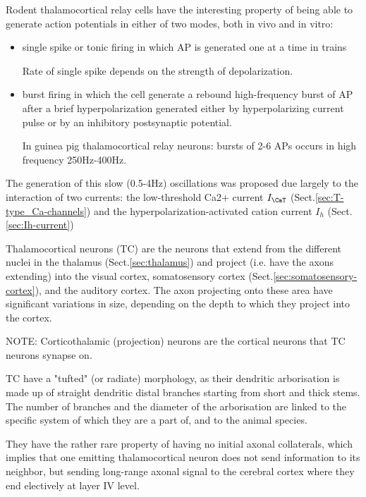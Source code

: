 Rodent thalamocortical relay cells have the interesting property of being able
to generate action potentials in either of two modes, both in vivo and in vitro:
\begin{itemize}
  \item single spike or tonic firing in which AP is generated one at a time in
  trains

Rate of single spike depends on the strength of depolarization. 

  \item burst firing in which the
  cell generate a rebound high-frequency burst of AP after a brief
  hyperpolarization generated either by hyperpolarizing current pulse or by an
  inhibitory postsynaptic potential.
  
In guinea pig thalamocortical relay neurons: bursts of 2-6 APs occurs in high
frequency 250Hz-400Hz. 
\end{itemize}

The generation of this slow (0.5-4Hz) oscillations was proposed due largely to
the interaction of two currents:
the low-threshold Ca2+ current $I_\CaT$ (Sect.\ref{sec:T-type_Ca-channels}) and the
hyperpolarization-activated cation current $I_h$ (Sect.\ref{sec:Ih-current})



Thalamocortical neurons (TC) are the neurons that extend from the different
nuclei in the thalamus (Sect.\ref{sec:thalamus}) and project (i.e. have the
axons extending) into the visual cortex, somatosensory cortex
(Sect.\ref{sec:somatosensory-cortex}), and the auditory cortex.
The axon projecting onto these area have significant variations in size,
depending on the depth to which they project into the cortex.
  
NOTE: Corticothalamic (projection) neurons are the cortical neurons that TC
neurons synapse on.

TC have a "tufted" (or radiate) morphology, as their dendritic arborisation is
made up of straight dendritic distal branches starting from short and thick
stems.
The number of branches and the diameter of the arborisation are linked to the
specific system of which they are a part of, and to the animal species.

They have the rather rare property of having no initial axonal collaterals,
which implies that one emitting thalamocortical neuron does not send information
to its neighbor, but sending long-range axonal signal to the cerebral cortex
where they end electively at layer IV level.

